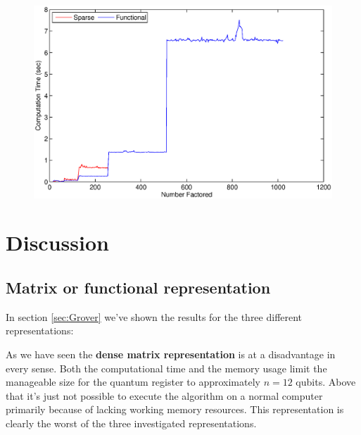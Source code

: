 \documentclass[bibliography=totocnumbered, 10pt]{article}
\theoremstyle{NoticeStyle}
\begin{document}
\begin{figure}[H]
	\centering
	\includegraphics[width=\textwidth]{img/Shor_Time.eps}
	\caption{}
	\label{shor_time}
\end{figure}


%
\section{Discussion}\label{sec:Discussion}

\subsection{Matrix or functional representation}

In section \ref{sec:Grover} we've shown the results for the three different representations:

As we have seen the \textbf{dense matrix representation} is at a disadvantage in every sense. Both the computational time and the memory usage limit the manageable size for the quantum register to approximately $n=12$ qubits. Above that it's just not possible to execute the algorithm on a normal computer primarily because of lacking working memory resources. This representation is clearly the worst of the three investigated representations.
\end{document}
